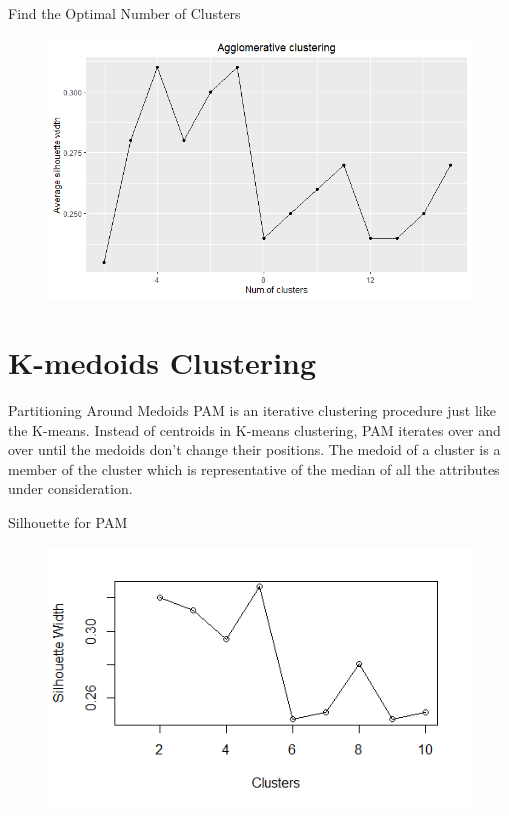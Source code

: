 \documentclass[11pt]{beamer}
\begin{document}
\begin{frame}{Find the Optimal Number of Clusters}
\begin{figure}[!htb]
\begin{minipage}{0.48\textwidth}
     \includegraphics[width=1\linewidth]{images/agg_sil_ward.png}
     \label{Fig:skew2}
   \end{minipage}
\end{figure}

    
\end{frame}

\section{K-medoids Clustering}
\begin{frame}{Partitioning Around Medoids}
PAM is an iterative clustering procedure just like the K-means. Instead of centroids in K-means clustering, PAM iterates over and over until the medoids don't change their positions. The medoid of a cluster is a member of the cluster which is representative of the median of all the attributes under consideration.\cite{bhat2014k}


\end{frame}

\begin{frame}{Silhouette for PAM}
\begin{figure}
    \centering
    \includegraphics[width=1\linewidth]{images/sil_for_PAM.png}
    \label{fig:my_label}
\end{figure}

\end{frame}
\end{document}
